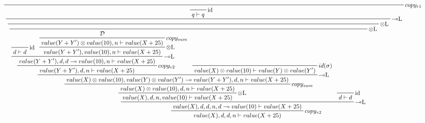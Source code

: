 \documentclass[sigconf]{acmart}
\begin{document}
\begin{figure*}
  \[
    \prftree[r] {$copy_{r1}$} {
      \prftree[r] {$\multimap$L}
      {
        \prftree[r] {id} { q\vdash q }
      }
      {
        \prftree[r] {$\otimes$L}
        {
          \prftree[r] {$\otimes$L}
          {
            \prftree[r] {$copy_{v2}$}
            {
              \prftree[r] {$\multimap$L}
              {
                \prftree[r]{$\otimes$L}
                {
                  \prftree[r]{$copy_{sum}$}
                  {
                    \prftree[r] {$\multimap$L}
                    {
                      \prftree[r] {$copy_{v2}$}
                      {
                        \prftree[r] {$\multimap$L}
                        {
                          \prftree[r] {id} {d\vdash d}
                        }
                        {
                          \prftree[r] {$\otimes$L}
                          {
                            \prftree[r] {$copy_{sum}$}
                            {
                              \mathcal{D}
                            }
                            {
                              value(Y + Y')\otimes value(10), n \vdash value(X + 25)
                            }
                          }
                          {
                          value(Y + Y'), value(10), n \vdash value(X + 25)
                          }
                        }
                        {
                          value(Y + Y'), d, d\multimap value(10), n \vdash value(X + 25)
                        }
                      }
                      {
                      value(Y + Y'), d, n \vdash value(X + 25)
                      }
                    }
                    {
                      \prftree[r] {$id(\sigma)$}
                      {
                        value(X)\otimes value(10) \vdash value(Y)\otimes value(Y')
                      }
                    }
                    {
                      value(X)\otimes value(10), value(Y)\otimes value(Y')\multimap value(Y + Y'), d, n \vdash value(X + 25)
                    }
                  }
                  {
                    value(X)\otimes value(10), d, n \vdash value(X + 25)
                  }
                }
                {
                  value(X), d, n, value(10)\vdash value(X + 25)
                }
              }
              {
                \prftree[r]{id} {d\vdash d}
              }
              {
                value(X), d, d, n, d\multimap value(10)\vdash value(X + 25)
              }
            }
            {
              value(X), d, d, n\vdash value(X + 25)
}}}}}\]
\end{figure*}
\end{document}

